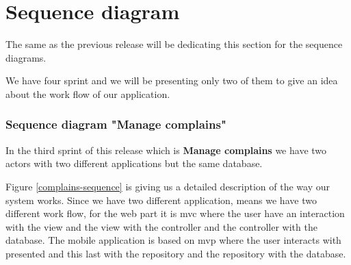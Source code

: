 \documentclass[12pt,a4paper]{report}
\begin{document}
\section{Sequence diagram}
The same as the previous release will be dedicating this section for the sequence diagrams.\par 
We have four sprint and we will be presenting only two of them to give an idea about the work flow of our application.
\subsubsection*{Sequence diagram "Manage complains"}
In the third sprint of this release which is \textbf{Manage complains} we have two actors with two different applications but the same database.\par 
Figure \ref{complains-sequence} is giving us a detailed description of the way our system works. Since we have two different application, means we have two different work flow, for the web part it is \ac{mvc} where the user have an interaction with the view and the view with the controller and the controller with the database. The mobile application is based on \ac{mvp} where the user interacts with presented and this last with the repository and the repository with the database.\par
\end{document}
